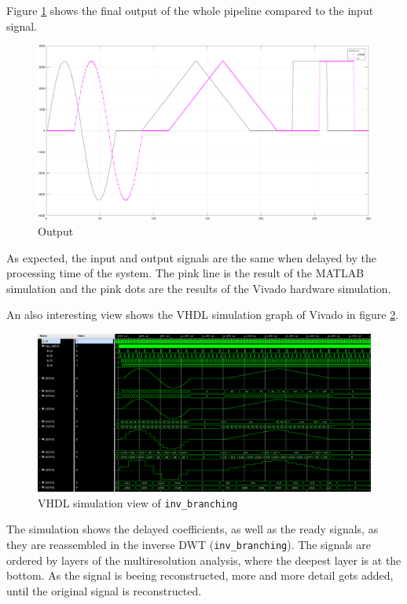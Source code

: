 \begin{refsection}
Figure \ref{fpga:fig:output} shows the final output of the whole pipeline compared to the input signal. 
\begin{figure}
	\centering
	\includegraphics[width=\textwidth]{papers/fpga/images/output_with_step.pdf}
	\caption{Output \label{fpga:fig:output}}
\end{figure}
As expected, the input and output signals are the same when delayed by the processing time of the system.
The pink line is the result of the MATLAB simulation and the pink dots are the results of the Vivado hardware simulation. 

An also interesting view shows the VHDL simulation graph of Vivado in figure \ref{fpga:fig:sim}.
\begin{figure}
	\centering
	\includegraphics[width=\textwidth]{papers/fpga/images/inv_branching_screenshot.PNG}
	\caption{VHDL simulation view of \texttt{inv\_branching} \label{fpga:fig:sim}}
\end{figure}
The simulation shows the delayed coefficients, as well as the ready signals, as they are reassembled in the inverse DWT (\texttt{inv\_branching}).
The signals are ordered by layers of the multiresolution analysis, where the deepest layer is at the bottom.
As the signal is beeing reconstructed, more and more detail gets added, until the original signal is reconstructed.


\end{refsection}
